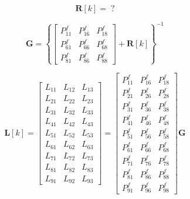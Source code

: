 \documentclass[UTF8,11pt,a4paper]{ctexart}
\begin{document}
\[
{\mathbf{R}}[k] = \;?
\]

\[
\mathbf{G}
= \left\{
\begin{bmatrix}
P_{11}^f & P_{16}^f & P_{18}^f\\
P_{61}^f & P_{66}^f & P_{68}^f\\
P_{81}^f & P_{86}^f & P_{88}^f
\end{bmatrix}
+ {\mathbf{R}}[k]
\right\}^{-1}
\]

\[
\mathbf{L}[k]
= \begin{bmatrix}
L_{11}&L_{12}&L_{13}\\
L_{21}&L_{22}&L_{23}\\
L_{31}&L_{32}&L_{33}\\
L_{41}&L_{42}&L_{43}\\
L_{51}&L_{52}&L_{53}\\
L_{61}&L_{62}&L_{63}\\
L_{71}&L_{72}&L_{73}\\
L_{81}&L_{82}&L_{83}\\
L_{91}&L_{92}&L_{93}
\end{bmatrix}
=
\begin{bmatrix}
P_{11}^f & P_{16}^f & P_{18}^f\\
P_{21}^f & P_{26}^f & P_{28}^f\\
P_{31}^f & P_{36}^f & P_{38}^f\\
P_{41}^f & P_{46}^f & P_{48}^f\\
P_{51}^f & P_{56}^f & P_{58}^f\\
P_{61}^f & P_{66}^f & P_{68}^f\\
P_{71}^f & P_{76}^f & P_{78}^f\\
P_{81}^f & P_{86}^f & P_{88}^f\\
P_{91}^f & P_{96}^f & P_{98}^f
\end{bmatrix}
\mathbf{G}
\]
\end{document}
